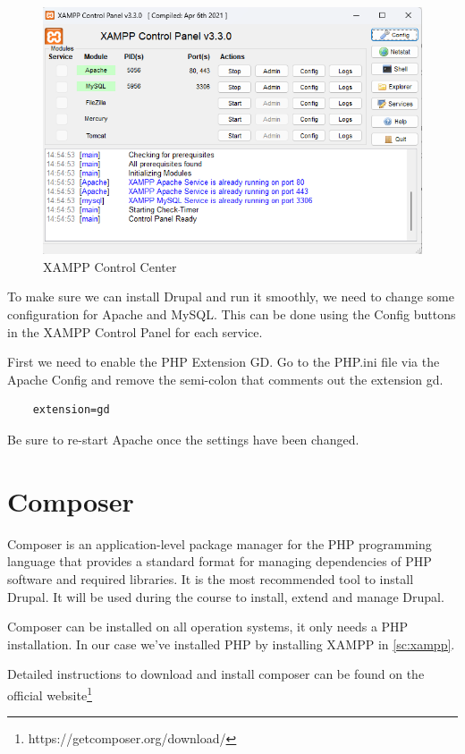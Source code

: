 \begin{figure}[h]
    \centering
    \includegraphics[width=1\linewidth]{img/ch2/xampp}
    \caption{XAMPP Control Center}
    \label{fig:xampp}
\end{figure}

To make sure we can install Drupal and run it smoothly, we need to change some configuration for Apache and MySQL. This can be done using the Config buttons in the XAMPP Control Panel for each service.

First we need to enable the PHP Extension GD. Go to the PHP.ini file via the Apache Config and remove the semi-colon that comments out the extension gd.

\begin{verbatim}
    extension=gd
\end{verbatim}

Be sure to re-start Apache once the settings have been changed.

\section{Composer}
Composer is an application-level package manager for the PHP programming language that provides a standard format for managing dependencies of PHP software and required libraries. 
It is the most recommended tool to install Drupal.
It will be used during the course to install, extend and manage Drupal.

Composer can be installed on all operation systems, it only needs a PHP installation.
In our case we've installed PHP by installing XAMPP in \ref{sc:xampp}.

    Detailed instructions to download and install composer can be found on the official website\footnote{https://getcomposer.org/download/}


